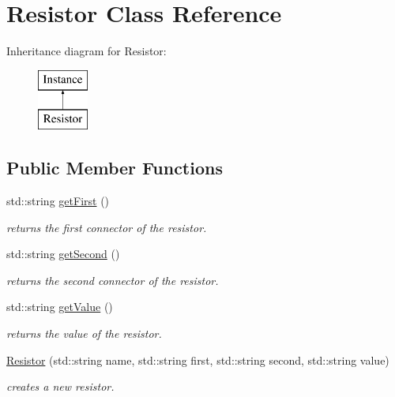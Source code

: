 \hypertarget{class_s_p_i_c_e_1_1_resistor}{}\section{Resistor Class Reference}
\label{class_s_p_i_c_e_1_1_resistor}
Inheritance diagram for Resistor\+:\begin{figure}[H]
\begin{center}
\leavevmode
\includegraphics[height=2.000000cm]{class_s_p_i_c_e_1_1_resistor}
\end{center}
\end{figure}
\subsection*{Public Member Functions}
\begin{DoxyCompactItemize}
\item 
\mbox{\label{class_s_p_i_c_e_1_1_resistor_ab57aa52f48a5a56c89dd49eae66c1a0f}} 
std\+::string \hyperlink{class_s_p_i_c_e_1_1_resistor_ab57aa52f48a5a56c89dd49eae66c1a0f}{get\+First} ()
\begin{DoxyCompactList}\small\item\em returns the first connector of the resistor. \end{DoxyCompactList}\item 
\mbox{\label{class_s_p_i_c_e_1_1_resistor_a9665313821b2fca41e14b9865133af7f}} 
std\+::string \hyperlink{class_s_p_i_c_e_1_1_resistor_a9665313821b2fca41e14b9865133af7f}{get\+Second} ()
\begin{DoxyCompactList}\small\item\em returns the second connector of the resistor. \end{DoxyCompactList}\item 
\mbox{\label{class_s_p_i_c_e_1_1_resistor_a4c052cb2622c580a250b2c783a436882}} 
std\+::string \hyperlink{class_s_p_i_c_e_1_1_resistor_a4c052cb2622c580a250b2c783a436882}{get\+Value} ()
\begin{DoxyCompactList}\small\item\em returns the value of the resistor. \end{DoxyCompactList}\item 
\hyperlink{class_s_p_i_c_e_1_1_resistor_aa4e89fab1189113134e98edbb0c622bf}{Resistor} (std\+::string name, std\+::string first, std\+::string second, std\+::string value)
\begin{DoxyCompactList}\small\item\em creates a new resistor. \end{DoxyCompactList}\end{DoxyCompactItemize}


